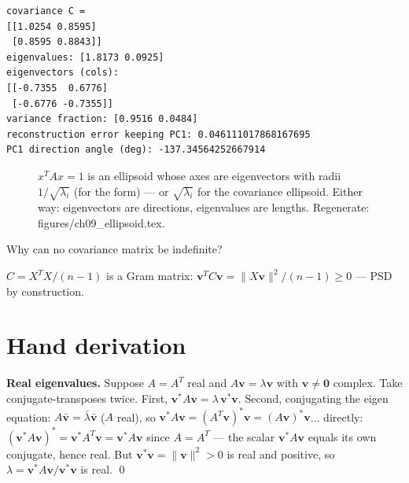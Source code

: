 \begin{lstlisting}[caption={Output of the covariance eigensolve. Notice
$95\%$ of variance rides one eigenvector --- projecting onto it loses
only $0.046$ mean-square error. This is chapter 10's PCA with the SVD
training wheels still on.}]
covariance C =
[[1.0254 0.8595]
 [0.8595 0.8843]]
eigenvalues: [1.8173 0.0925]
eigenvectors (cols):
[[-0.7355  0.6776]
 [-0.6776 -0.7355]]
variance fraction: [0.9516 0.0484]
reconstruction error keeping PC1: 0.046111017868167695
PC1 direction angle (deg): -137.34564252667914
\end{lstlisting}

\begin{figure}[htbp]
\centering

\caption{$x^{T}Ax=1$ is an ellipsoid whose axes are eigenvectors with
radii $1/\sqrt{\lambda_i}$ (for the form) --- or $\sqrt{\lambda_i}$ for
the covariance ellipsoid. Either way: eigenvectors are directions,
eigenvalues are lengths. Regenerate:
\ttfamily figures/ch09\_ellipsoid.tex.}
\label{fig:ellipsoid}
\end{figure}

\begin{exercise}[easy]
Why can no covariance matrix be indefinite?
\begin{solution}
$C=X^{T}X/(n-1)$ is a Gram matrix: $\mathbf v^{T}C\mathbf v=
\lVert X\mathbf v\rVert^{2}/(n-1)\ge0$ --- PSD by construction.
\end{solution}
\end{exercise}

\section{Hand derivation}\label{sec:handderiv9}

\textbf{Real eigenvalues.} Suppose $A=A^{T}$ real and
$A\mathbf v=\lambda\mathbf v$ with $\mathbf v\ne\mathbf0$ complex. Take
conjugate-transposes twice. First,
$\mathbf v^{*}A\mathbf v=\lambda\,\mathbf v^{*}\mathbf v$. Second,
conjugating the eigen equation: $A\bar{\mathbf v}=\bar\lambda\bar{\mathbf v}$
($A$ real), so
$\mathbf v^{*}A\mathbf v=(A^{T}\mathbf v)^{*}\mathbf v
=(A\mathbf v)^{*}\mathbf v$... directly:
$(\mathbf v^{*}A\mathbf v)^{*}=\mathbf v^{*}A^{T}\mathbf v
=\mathbf v^{*}A\mathbf v$ since $A=A^{T}$ --- the scalar
$\mathbf v^{*}A\mathbf v$ equals its own conjugate, hence real. But
$\mathbf v^{*}\mathbf v=\lVert\mathbf v\rVert^{2}>0$ is real and positive,
so $\lambda=\mathbf v^{*}A\mathbf v/\mathbf v^{*}\mathbf v$ is real.
\qed

